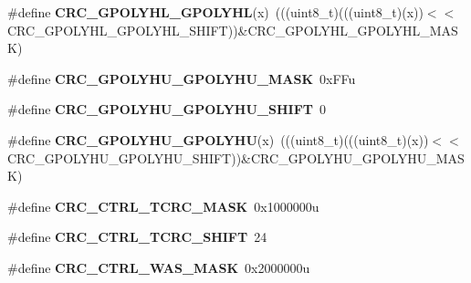 \begin{DoxyCompactItemize}
\item 
\#define {\bfseries C\+R\+C\+\_\+\+G\+P\+O\+L\+Y\+H\+L\+\_\+\+G\+P\+O\+L\+Y\+HL}(x)~(((uint8\+\_\+t)(((uint8\+\_\+t)(x))$<$$<$C\+R\+C\+\_\+\+G\+P\+O\+L\+Y\+H\+L\+\_\+\+G\+P\+O\+L\+Y\+H\+L\+\_\+\+S\+H\+I\+FT))\&C\+R\+C\+\_\+\+G\+P\+O\+L\+Y\+H\+L\+\_\+\+G\+P\+O\+L\+Y\+H\+L\+\_\+\+M\+A\+SK)\hypertarget{group__CRC__Register__Masks_ga2620d4495edbf2e97ad905e12bf3e0a5}{}\label{group__CRC__Register__Masks_ga2620d4495edbf2e97ad905e12bf3e0a5}

\item 
\#define {\bfseries C\+R\+C\+\_\+\+G\+P\+O\+L\+Y\+H\+U\+\_\+\+G\+P\+O\+L\+Y\+H\+U\+\_\+\+M\+A\+SK}~0x\+F\+Fu\hypertarget{group__CRC__Register__Masks_gac0f3f7a896e1ef279b948d778274cf04}{}\label{group__CRC__Register__Masks_gac0f3f7a896e1ef279b948d778274cf04}

\item 
\#define {\bfseries C\+R\+C\+\_\+\+G\+P\+O\+L\+Y\+H\+U\+\_\+\+G\+P\+O\+L\+Y\+H\+U\+\_\+\+S\+H\+I\+FT}~0\hypertarget{group__CRC__Register__Masks_ga448d4b6c4e930f1c84294da6607faac4}{}\label{group__CRC__Register__Masks_ga448d4b6c4e930f1c84294da6607faac4}

\item 
\#define {\bfseries C\+R\+C\+\_\+\+G\+P\+O\+L\+Y\+H\+U\+\_\+\+G\+P\+O\+L\+Y\+HU}(x)~(((uint8\+\_\+t)(((uint8\+\_\+t)(x))$<$$<$C\+R\+C\+\_\+\+G\+P\+O\+L\+Y\+H\+U\+\_\+\+G\+P\+O\+L\+Y\+H\+U\+\_\+\+S\+H\+I\+FT))\&C\+R\+C\+\_\+\+G\+P\+O\+L\+Y\+H\+U\+\_\+\+G\+P\+O\+L\+Y\+H\+U\+\_\+\+M\+A\+SK)\hypertarget{group__CRC__Register__Masks_ga3a5bf9b2f9fae47e0e669010c130ade2}{}\label{group__CRC__Register__Masks_ga3a5bf9b2f9fae47e0e669010c130ade2}

\item 
\#define {\bfseries C\+R\+C\+\_\+\+C\+T\+R\+L\+\_\+\+T\+C\+R\+C\+\_\+\+M\+A\+SK}~0x1000000u\hypertarget{group__CRC__Register__Masks_gad441a2b8f6300b71038d47cc3c8c0fcc}{}\label{group__CRC__Register__Masks_gad441a2b8f6300b71038d47cc3c8c0fcc}

\item 
\#define {\bfseries C\+R\+C\+\_\+\+C\+T\+R\+L\+\_\+\+T\+C\+R\+C\+\_\+\+S\+H\+I\+FT}~24\hypertarget{group__CRC__Register__Masks_ga7c3cc17a7bc8f6c0621f3ce91e7b2b3e}{}\label{group__CRC__Register__Masks_ga7c3cc17a7bc8f6c0621f3ce91e7b2b3e}

\item 
\#define {\bfseries C\+R\+C\+\_\+\+C\+T\+R\+L\+\_\+\+W\+A\+S\+\_\+\+M\+A\+SK}~0x2000000u\hypertarget{group__CRC__Register__Masks_gaf3955c626d1b33289184fdc8a8a09147}{}\label{group__CRC__Register__Masks_gaf3955c626d1b33289184fdc8a8a09147}


\end{DoxyCompactItemize}
